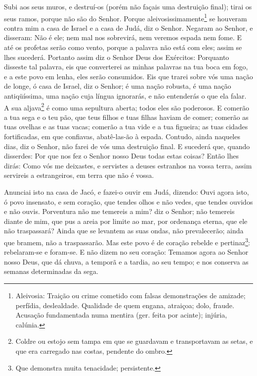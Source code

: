 Subi aos seus muros, e destruí-os (porém não façais uma
destruição final); tirai os seus ramos, porque não são do Senhor.
Porque aleivosissimamente\footnote{Aleivosia: Traição ou
crime cometido com falsas demonstrações de amizade; perfídia,
deslealdade. Qualidade de quem engana, atraiçoa; dolo, fraude.
Acusação fundamentada numa mentira (ger. feita por acinte); injúria,
calúnia.} se houveram contra mim a casa de Israel e a casa de Judá,
diz o Senhor. Negaram ao Senhor, e disseram: Não é ele; nem
mal nos sobrevirá, nem veremos espada nem fome. E até os
profetas serão como vento, porque a palavra não está com eles; assim
se lhes sucederá. Portanto assim diz o Senhor Deus dos
Exércitos: Porquanto disseste tal palavra, eis que converterei as
minhas palavras na tua boca em fogo, e a este povo em lenha, eles
serão consumidos. Eis que trarei sobre vós uma nação de
longe, ó casa de Israel, diz o Senhor; é uma nação robusta, é uma
nação antiqüíssima, uma nação cuja língua ignorarás, e não
entenderás o que ela falar. A sua aljava\footnote{Coldre ou
estojo sem tampa em que se guardavam e transportavam as setas, e que
era carregado nas costas, pendente do ombro.} é como uma sepultura
aberta; todos eles são poderosos. E comerão a tua sega e o
teu pão, que teus filhos e tuas filhas haviam de comer; comerão as
tuas ovelhas e as tuas vacas; comerão a tua vide e a tua figueira;
as tuas cidades fortificadas, em que confiavas, abatê-las-ão à
espada. Contudo, ainda naqueles dias, diz o Senhor, não farei
de vós uma destruição final. E sucederá que, quando
disserdes: Por que nos fez o Senhor nosso Deus todas estas coisas?
Então lhes dirás: Como vós me deixastes, e servistes a deuses
estranhos na vossa terra, assim servireis a estrangeiros, em terra
que não é vossa.

Anunciai isto na casa de Jacó, e fazei-o ouvir em Judá, dizendo:
Ouvi agora isto, ó povo insensato, e sem coração, que tendes
olhos e não vedes, que tendes ouvidos e não ouvis. Porventura
não me temereis a mim? diz o Senhor; não temereis diante de mim, que
pus a areia por limite ao mar, por ordenança eterna, que ele não
traspassará? Ainda que se levantem as suas ondas, não prevalecerão;
ainda que bramem, não a traspassarão. Mas este povo é de
coração rebelde e pertinaz\footnote{Que demonstra muita tenacidade;
persistente.}: rebelaram-se e foram-se. E não dizem no seu
coração: Temamos agora ao Senhor nosso Deus, que dá chuva, a temporã
e a tardia, ao seu tempo; e nos conserva as semanas determinadas da
sega.


